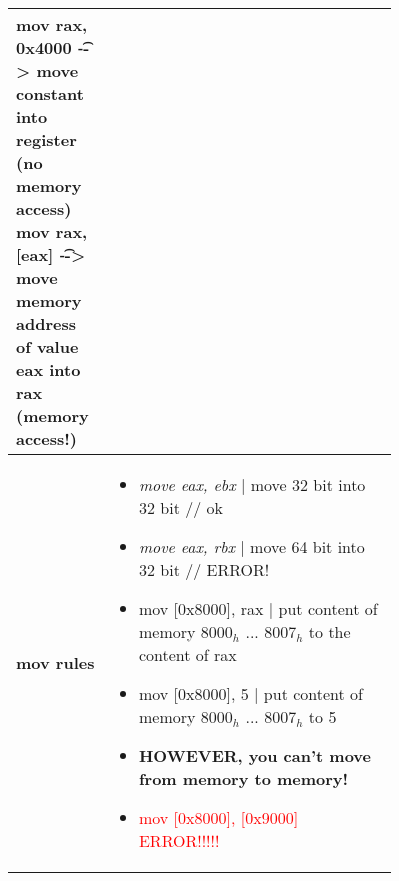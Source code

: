 \documentclass[main.tex,fontsize=8pt,paper=a4,paper=portrait,DIV=calc,]{scrartcl}
\begin{document}
\begin{table}[h!]
\begin{tabular}{|m{0,2\linewidth}|m{0.755\linewidth}|}
mov rax, 0x4000 \t --> move constant into register (no memory access)\newline
mov rax, [eax] \t --> move memory address of value eax into rax (memory access!)\\
\hline
\textbf{mov rules} &
\vspace{2mm}
\begin{itemize}
  \item \emph{move eax, ebx} | move 32 bit into 32 bit // ok
  \item \emph{move eax, rbx} | move 64 bit into 32 bit // ERROR!
  \item mov [0x8000], rax | put content of memory \(8000_h\) ... \(8007_h\) to the content of rax
  \item mov [0x8000], 5 | put content of memory \(8000_h\) ... \(8007_h\) to 5
  \item \textbf{HOWEVER, you can't move from memory to memory!}
  \item \textcolor{red}{mov [0x8000], [0x9000] ERROR!!!!!}
  \vspace{-3mm}
\end{itemize}\\
\hline
\end{tabular}
\end{table}
\pagebreak
\end{document}

